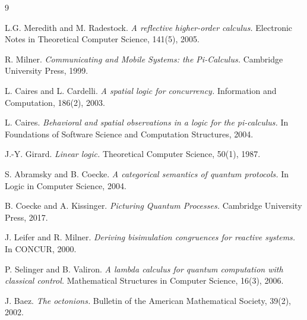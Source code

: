 \documentclass[11pt]{article}
\theoremstyle{definition}
\theoremstyle{remark}
\begin{document}
\begin{thebibliography}{9}

 L.G. Meredith and M. Radestock.
  \emph{A reflective higher-order calculus.}
  Electronic Notes in Theoretical Computer Science, 141(5), 2005.

 R. Milner.
  \emph{Communicating and Mobile Systems: the Pi-Calculus.}
  Cambridge University Press, 1999.

 L. Caires and L. Cardelli.
  \emph{A spatial logic for concurrency.}
  Information and Computation, 186(2), 2003.

 L. Caires.
  \emph{Behavioral and spatial observations in a logic for the pi-calculus.}
  In Foundations of Software Science and Computation Structures, 2004.

 J.-Y. Girard.
  \emph{Linear logic.}
  Theoretical Computer Science, 50(1), 1987.

 S. Abramsky and B. Coecke.
  \emph{A categorical semantics of quantum protocols.}
  In Logic in Computer Science, 2004.

 B. Coecke and A. Kissinger.
  \emph{Picturing Quantum Processes.}
  Cambridge University Press, 2017.

 J. Leifer and R. Milner.
  \emph{Deriving bisimulation congruences for reactive systems.}
  In CONCUR, 2000.

 P. Selinger and B. Valiron.
  \emph{A lambda calculus for quantum computation with classical control.}
  Mathematical Structures in Computer Science, 16(3), 2006.

 J. Baez.
  \emph{The octonions.}
  Bulletin of the American Mathematical Society, 39(2), 2002.

\end{thebibliography}
\end{document}
